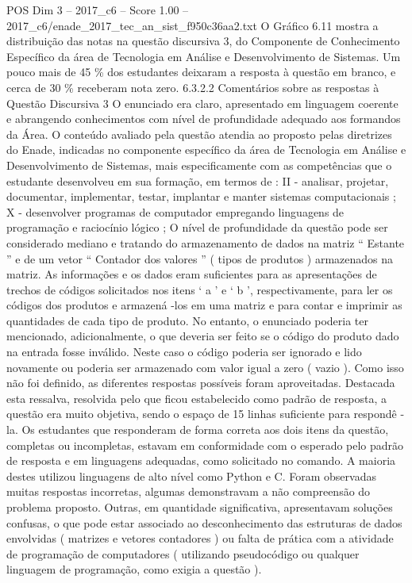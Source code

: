 \begin{textsample}{POS Dim 3 – 2017\_c6 – Score 1.00 – 2017\_c6/enade\_2017\_tec\_an\_sist\_f950c36aa2.txt}
O Gráfico 6.11 mostra a distribuição das notas na questão discursiva 3, do Componente de Conhecimento Específico da área de Tecnologia em Análise e Desenvolvimento de Sistemas.
Um pouco mais de 45 \% dos estudantes deixaram a resposta à questão em branco, e cerca de 30 \% receberam nota zero. 6.3.2.2 Comentários sobre as respostas à Questão Discursiva 3 O enunciado era claro, apresentado em linguagem coerente e abrangendo conhecimentos com nível de profundidade adequado aos formandos da Área.
O conteúdo avaliado pela questão atendia ao proposto pelas diretrizes do Enade, indicadas no componente específico da área de Tecnologia em Análise e Desenvolvimento de Sistemas, mais especificamente com as competências que o estudante desenvolveu em sua formação, em termos de : II - analisar, projetar, documentar, implementar, testar, implantar e manter sistemas computacionais ; X - desenvolver programas de computador empregando linguagens de programação e raciocínio lógico ; O nível de profundidade da questão pode ser considerado mediano e tratando do armazenamento de dados na matriz “ Estante ” e de um vetor “ Contador dos valores ” ( tipos de produtos ) armazenados na matriz.
As informações e os dados eram suficientes para as apresentações de trechos de códigos solicitados nos itens ‘ a ’ e ‘ b ’, respectivamente, para ler os códigos dos produtos e armazená -los em uma matriz e para contar e imprimir as quantidades de cada tipo de produto.
No entanto, o enunciado poderia ter mencionado, adicionalmente, o que deveria ser feito se o código do produto dado na entrada fosse inválido.
Neste caso o código poderia ser ignorado e lido novamente ou poderia ser armazenado com valor igual a zero ( vazio ).
Como isso não foi definido, as diferentes respostas possíveis foram aproveitadas.
Destacada esta ressalva, resolvida pelo que ficou estabelecido como padrão de resposta, a questão era muito objetiva, sendo o espaço de 15 linhas suficiente para respondê -la.
Os estudantes que responderam de forma correta aos dois itens da questão, completas ou incompletas, estavam em conformidade com o esperado pelo padrão de resposta e em linguagens adequadas, como solicitado no comando.
A maioria destes utilizou linguagens de alto nível como Python e C.
Foram observadas muitas respostas incorretas, algumas demonstravam a não compreensão do problema proposto.
Outras, em quantidade significativa, apresentavam soluções confusas, o que pode estar associado ao desconhecimento das estruturas de dados envolvidas ( matrizes e vetores contadores ) ou falta de prática com a atividade de programação de computadores ( utilizando pseudocódigo ou qualquer linguagem de programação, como exigia a questão ).

\end{textsample}
